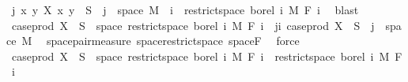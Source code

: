 \begin{isabellebody}
\ {\isachardoublequoteopen}{\isacharparenleft}{\kern0pt}{\isasymlambda}j{\isachardot}{\kern0pt}\ {\isacharparenleft}{\kern0pt}{\isasymlambda}{\isacharparenleft}{\kern0pt}x{\isacharcomma}{\kern0pt}\ y{\isacharparenright}{\kern0pt}{\isachardot}{\kern0pt}\ X\ x\ y{\isacharparenright}{\kern0pt}\ {\isacharminus}{\kern0pt}{\isacharbackquote}{\kern0pt}\ S\ {\isasyminter}\ {\isacharbraceleft}{\kern0pt}j{\isacharbraceright}{\kern0pt}\ {\isasymtimes}\ space\ M{\isacharparenright}{\kern0pt}\ {\isacharbackquote}{\kern0pt}\ {\isacharbraceleft}{\kern0pt}{\isachardot}{\kern0pt}{\isachardot}{\kern0pt}i{\isacharbraceright}{\kern0pt}\ {\isasymsubseteq}\ restrict{\isacharunderscore}{\kern0pt}space\ borel\ {\isacharbraceleft}{\kern0pt}{}{\isachardot}{\kern0pt}{\isachardot}{\kern0pt}i{\isacharbraceright}{\kern0pt}\ {\isasymOtimes}\isactrlsub M\ F\ i{\isachardoublequoteclose}\ \isamarkupfalse%
\ blast\isanewline
\ \ \ \ \isamarkupfalse%
\ \isamarkupfalse%
\ {\isachardoublequoteopen}case{\isacharunderscore}{\kern0pt}prod\ X\ {\isacharminus}{\kern0pt}{\isacharbackquote}{\kern0pt}\ S\ {\isasyminter}\ space\ {\isacharparenleft}{\kern0pt}restrict{\isacharunderscore}{\kern0pt}space\ borel\ {\isacharbraceleft}{\kern0pt}{}{\isachardot}{\kern0pt}{\isachardot}{\kern0pt}i{\isacharbraceright}{\kern0pt}\ {\isasymOtimes}\isactrlsub M\ F\ i{\isacharparenright}{\kern0pt}\ {\isacharequal}{\kern0pt}\ {\isacharparenleft}{\kern0pt}{\isasymUnion}j{\isasymle}i{\isachardot}{\kern0pt}\ case{\isacharunderscore}{\kern0pt}prod\ X\ {\isacharminus}{\kern0pt}{\isacharbackquote}{\kern0pt}\ S\ {\isasyminter}\ {\isacharbraceleft}{\kern0pt}j{\isacharbraceright}{\kern0pt}\ {\isasymtimes}\ space\ M{\isacharparenright}{\kern0pt}{\isachardoublequoteclose}\ \isamarkupfalse%
\ space{\isacharunderscore}{\kern0pt}pair{\isacharunderscore}{\kern0pt}measure\ space{\isacharunderscore}{\kern0pt}restrict{\isacharunderscore}{\kern0pt}space\ space{\isacharunderscore}{\kern0pt}F\ \isamarkupfalse%
\ force\ \ \isanewline
\ \ \ \ \isamarkupfalse%
\ \isamarkupfalse%
\ {\isachardoublequoteopen}case{\isacharunderscore}{\kern0pt}prod\ X\ {\isacharminus}{\kern0pt}{\isacharbackquote}{\kern0pt}\ S\ {\isasyminter}\ space\ {\isacharparenleft}{\kern0pt}restrict{\isacharunderscore}{\kern0pt}space\ borel\ {\isacharbraceleft}{\kern0pt}{}{\isachardot}{\kern0pt}{\isachardot}{\kern0pt}i{\isacharbraceright}{\kern0pt}\ {\isasymOtimes}\isactrlsub M\ F\ i{\isacharparenright}{\kern0pt}\ {\isasymin}\ restrict{\isacharunderscore}{\kern0pt}space\ borel\ {\isacharbraceleft}{\kern0pt}{}{\isachardot}{\kern0pt}{\isachardot}{\kern0pt}i{\isacharbraceright}{\kern0pt}\ {\isasymOtimes}\isactrlsub M\ F\ i{\isachardoublequoteclose}\ \isamarkupfalse%

\end{isabellebody}
